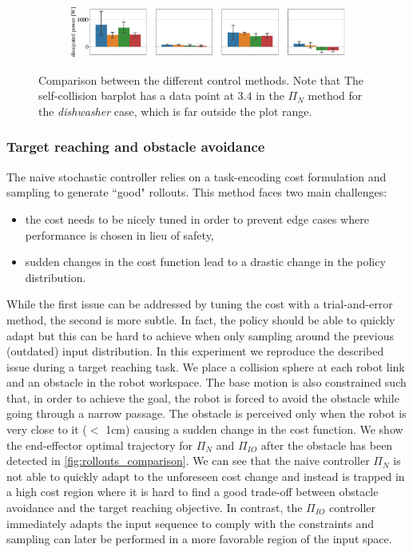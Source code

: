 \begin{figure}[t]
\begin{subfigure}{\columnwidth}
\end{subfigure} %
\hspace*{-0.2cm} 
\vspace*{0.1cm}
\begin{subfigure}{\columnwidth}
    \includegraphics[width=\linewidth]{figures/methods_comparison/dissipated_power.pdf}
\end{subfigure}
\hfill
\caption{Comparison between the different control methods. Note that The self-collision barplot has a data point at $3.4$ in the $\Pi_{N}$ method for the \textit{dishwasher} case, which is far outside the plot range.}\label{fig:methods_comparison}
\end{figure}

\vspace{0.3cm}
\subsubsection{Target reaching and obstacle avoidance}
The naive stochastic controller relies on a task-encoding cost formulation and sampling to generate ``good" rollouts. This method faces two main challenges:
\begin{itemize}
    \item the cost needs to be nicely tuned in order to prevent edge cases where performance is chosen in lieu of safety,
    \item sudden changes in the cost function lead to a drastic change in the policy distribution.
\end{itemize}
While the first issue can be addressed by tuning the cost with a trial-and-error method, the second is more subtle. In fact, the policy should be able to quickly adapt but this can be hard to achieve when only sampling around the previous (outdated) input distribution. In this experiment we reproduce the described issue during a target reaching task. We place a collision sphere at each robot link and an obstacle in the robot workspace. The base motion is also constrained such that, in order to achieve the goal, the robot is forced to avoid the obstacle while going through a narrow passage. The obstacle is perceived only when the robot is very close to it ($<$ 1cm) causing a sudden change in the cost function. We show the end-effector optimal trajectory for $\Pi_{N}$ and $\Pi_{IO}$ after the obstacle has been detected in \fig \ref{fig:rollouts_comparison}. We can see that the naive controller $\Pi_{N}$ is not able to quickly adapt to the unforeseen cost change and instead is trapped in a high cost region where it is hard to find a good trade-off between obstacle avoidance and the target reaching objective. In contrast, the $\Pi_{IO}$ controller immediately adapts the input sequence to comply with the constraints and sampling can later be performed in a more favorable region of the input space.   

